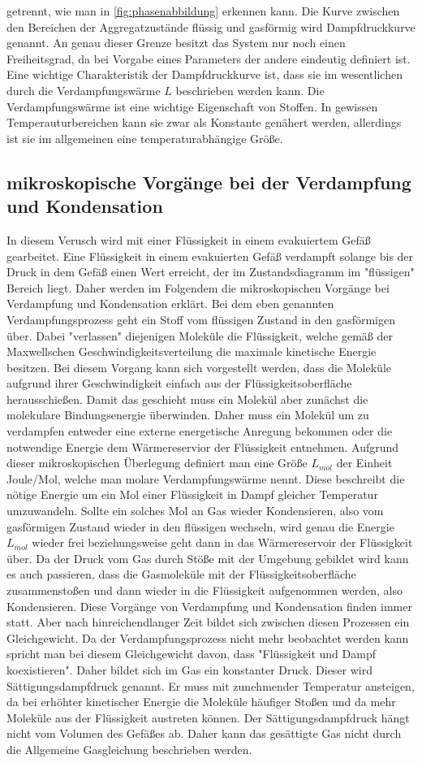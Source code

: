 getrennt, wie man in \autoref{fig:phasenabbildung} erkennen kann. Die Kurve zwischen den Bereichen der Aggregatzustände flüssig und gasförmig wird Dampfdruckkurve genannt. An genau dieser Grenze besitzt das System
nur noch einen Freiheitsgrad, da bei Vorgabe eines Parameters der andere eindeutig definiert ist. Eine wichtige Charakteristik der Dampfdruckkurve ist, dass sie im wesentlichen durch die 
Verdampfungswärme $L$ beschrieben werden kann. Die Verdampfungswärme ist eine wichtige Eigenschaft von Stoffen. In gewissen Temperauturbereichen kann sie zwar als Konstante genähert werden,
allerdings ist sie im allgemeinen eine temperaturabhängige Größe. 
\subsection{mikroskopische Vorgänge bei der Verdampfung und Kondensation}
\label{subsec:T_VK}
In diesem Verusch wird mit einer Flüssigkeit in einem evakuiertem Gefäß gearbeitet. Eine Flüssigkeit in einem evakuierten Gefäß verdampft solange bis der Druck in dem Gefäß einen Wert erreicht,
der im Zustandsdiagramm im "flüssigen" Bereich liegt. Daher werden im Folgendem die mikroskopischen Vorgänge bei Verdampfung und Kondensation erklärt. Bei dem eben genannten Verdampfungsprozess
geht ein Stoff vom flüssigen Zustand in den gasförmigen über. Dabei "verlassen" diejenigen Moleküle die Flüssigkeit, welche gemäß der Maxwellschen Geschwindigkeitsverteilung die maximale kinetische 
Energie besitzen. Bei diesem Vorgang kann sich vorgestellt werden, dass die Moleküle aufgrund ihrer Geschwindigkeit einfach aus der Flüssigkeitsoberfläche herausschießen. Damit das geschieht muss
ein Molekül aber zunächst die molekulare Bindungsenergie überwinden. Daher muss ein Molekül um zu verdampfen entweder eine externe energetische Anregung bekommen oder die notwendige Energie
dem Wärmereservior der Flüssigkeit entnehmen. Aufgrund dieser mikroskopischen Überlegung definiert man eine Größe $L_{mol}$ der Einheit Joule/Mol, welche man molare Verdampfungswärme nennt. Diese beschreibt die nötige Energie
um ein Mol einer Flüssigkeit in Dampf gleicher Temperatur umzuwandeln. Sollte ein solches Mol an Gas wieder Kondensieren, also vom gasförmigen Zustand wieder in den flüssigen wechseln, wird genau
die Energie $L_{mol}$ wieder frei beziehungsweise geht dann in das Wärmereservoir der Flüssigkeit über. Da der Druck vom Gas durch Stöße mit der Umgebung gebildet wird kann es auch passieren, dass
die Gasmoleküle mit der Flüssigkeitsoberfläche zusammenstoßen und dann wieder in die Flüssigkeit aufgenommen werden, also Kondensieren. Diese Vorgänge von Verdampfung und Kondensation finden immer statt.
Aber nach hinreichendlanger Zeit bildet sich zwischen diesen Prozessen ein Gleichgewicht. Da der Verdampfungsprozess nicht mehr beobachtet werden kann spricht man bei diesem Gleichgewicht
davon, dass "Flüssigkeit und Dampf koexistieren". Daher bildet sich im Gas ein konstanter Druck. Dieser wird Sättigungsdampfdruck genannt. Er muss mit zunehmender Temperatur ansteigen, da bei
erhöhter kinetischer Energie die Moleküle häufiger Stoßen und da mehr Moleküle aus der Flüssigkeit austreten können. Der Sättigungsdampfdruck hängt nicht vom Volumen des Gefäßes ab. Daher kann 
das gesättigte Gas nicht durch die Allgemeine Gasgleichung beschrieben werden.
